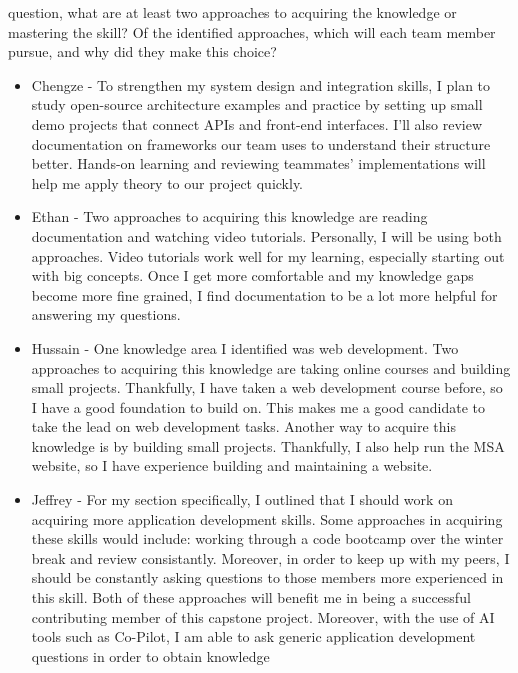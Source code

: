 \begin{enumerate}
  question, what are at least two approaches to acquiring the knowledge or
  mastering the skill?  Of the identified approaches, which will each team
  member pursue, and why did they make this choice?
  \begin{itemize}
        \item Chengze - To strengthen my system design and integration skills, 
        I plan to study open-source architecture examples and practice by setting 
        up small demo projects that connect APIs and front-end interfaces. I’ll also 
        review documentation on frameworks our team uses to understand their structure 
        better. Hands-on learning and reviewing teammates’ implementations will help 
        me apply theory to our project quickly.
        \item Ethan - Two approaches to acquiring this knowledge are reading
          documentation and watching video tutorials. Personally, I will be
          using both approaches. Video tutorials work well for my learning,
          especially starting out with big concepts. Once I get more
          comfortable and my knowledge gaps become more fine grained, I find
          documentation to be a lot more helpful for answering my questions.
        \item Hussain - One knowledge area I identified was web development. Two
        approaches to acquiring this knowledge are taking online courses and
        building small projects. Thankfully, I have taken a web development
        course before, so I have a good foundation to build on. This makes me a
        good candidate to take the lead on web development tasks. Another way
        to acquire this knowledge is by building small projects. Thankfully, I 
        also help run the MSA website, so I have experience building and
        maintaining a website. 
        \item Jeffrey - For my section specifically, I outlined that I should
        work on acquiring more application development skills. Some approaches
        in acquiring these skills would include: working through a code
        bootcamp over the winter break and review consistantly. Moreover,
        in order to keep up with my peers, I should be constantly asking
        questions to those members more experienced in this skill. Both
        of these approaches will benefit me in being a successful 
        contributing member of this capstone project. Moreover, with 
        the use of AI tools such as Co-Pilot, I am able to ask generic
        application development questions in order to obtain knowledge

\end{itemize}
\end{enumerate}
